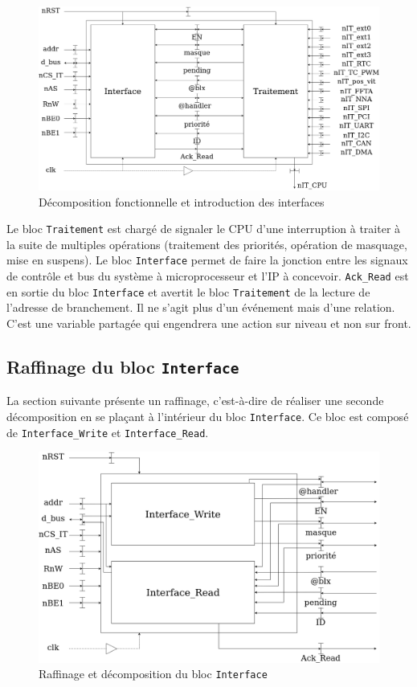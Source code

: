 \begin{figure}[H]
	\centering
	\includegraphics[width=1\linewidth]{figure/decomposition_fonctionnelle.png}
	\caption{Décomposition fonctionnelle et introduction des interfaces}
	\label{fig:decomposition_fonctionnelle}
\end{figure}

\newpage

Le bloc \texttt{Traitement} est chargé de signaler le CPU d'une interruption à traiter à la suite de multiples opérations (traitement des priorités, opération de masquage, mise en suspens).
Le bloc \texttt{Interface} permet de faire la jonction entre les signaux de contrôle et bus du système à microprocesseur et l'IP à concevoir.
\texttt{Ack\_Read} est en sortie du bloc \texttt{Interface} et avertit le bloc \texttt{Traitement} de la lecture de l'adresse de branchement.
Il ne s'agit plus d'un événement mais d'une relation.
C'est une variable partagée qui engendrera une action sur niveau et non sur front.

\subsection{Raffinage du bloc \texttt{Interface}}

La section suivante présente un raffinage, c'est-à-dire de réaliser une seconde décomposition en se plaçant à l'intérieur du bloc \texttt{Interface}.
Ce bloc est composé de \texttt{Interface\_Write} et \texttt{Interface\_Read}. 

\begin{figure}[H]
	\centering
	\includegraphics[width=1\linewidth]{figure/raffinage_interface.png}
	\caption{Raffinage et décomposition du bloc \texttt{Interface}}
	\label{fig:raffinage_interface}
\end{figure}

